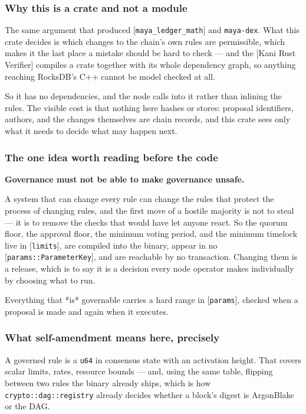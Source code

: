 \documentclass[11pt,a4paper]{article}
\begin{document}
\subsubsection{Why this is a crate and not a module}

The same argument that produced [\texttt{maya\_ledger\_math}] and \texttt{maya-dex}. What
this crate decides is which changes to the chain's own rules are
permissible, which makes it the last place a mistake should be hard to
check — and the [Kani Rust Verifier] compiles a crate together with its
whole dependency graph, so anything reaching RocksDB's C++ cannot be model
checked at all.

So it has no dependencies, and the node calls into it rather than inlining
the rules. The visible cost is that nothing here hashes or stores: proposal
identifiers, authors, and the changes themselves are chain records, and this
crate sees only what it needs to decide what may happen next.

\subsubsection{The one idea worth reading before the code}

\textbf{Governance must not be able to make governance unsafe.}

A system that can change every rule can change the rules that protect the
process of changing rules, and the first move of a hostile majority is not
to steal — it is to remove the checks that would have let anyone react. So
the quorum floor, the approval floor, the minimum voting period, and the
minimum timelock live in [\texttt{limits}], are compiled into the binary, appear in
no [\texttt{params::ParameterKey}], and are reachable by no transaction. Changing
them is a release, which is to say it is a decision every node operator
makes individually by choosing what to run.

Everything that *is* governable carries a hard range in [\texttt{params}], checked
when a proposal is made and again when it executes.

\subsubsection{What self-amendment means here, precisely}

A governed rule is a \texttt{u64} in consensus state with an activation height.
That covers scalar limits, rates, resource bounds — and, using the same
table, flipping between two rules the binary already ships, which is how
\texttt{crypto::dag::registry} already decides whether a block's digest is
ArgonBlake or the DAG.
\end{document}
